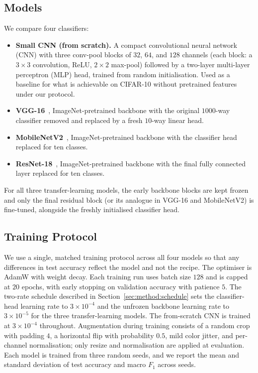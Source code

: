 \documentclass[10pt,twocolumn]{article}
\begin{document}
\subsection{Models}
\label{sec:exp:models}

We compare four classifiers:
\begin{itemize}
  \item \textbf{Small CNN (from scratch).} A compact convolutional neural network (CNN) with three conv-pool blocks of $32$, $64$, and $128$ channels (each block: a $3 \times 3$ convolution, ReLU, $2 \times 2$ max-pool) followed by a two-layer multi-layer perceptron (MLP) head, trained from random initialisation. Used as a baseline for what is achievable on CIFAR-10 without pretrained features under our protocol.
  \item \textbf{VGG-16}~\cite{simonyan2014vgg}, ImageNet-pretrained backbone with the original $1000$-way classifier removed and replaced by a fresh $10$-way linear head.
  \item \textbf{MobileNetV2}~\cite{sandler2018mobilenetv2}, ImageNet-pretrained backbone with the classifier head replaced for ten classes.
  \item \textbf{ResNet-18}~\cite{he2016resnet}, ImageNet-pretrained backbone with the final fully connected layer replaced for ten classes.
\end{itemize}
For all three transfer-learning models, the early backbone blocks are kept frozen and only the final residual block (or its analogue in VGG-16 and MobileNetV2) is fine-tuned, alongside the freshly initialised classifier head.

\subsection{Training Protocol}
\label{sec:exp:protocol}

We use a single, matched training protocol across all four models so that any differences in test accuracy reflect the model and not the recipe. The optimiser is AdamW with weight decay. Each training run uses batch size $128$ and is capped at $20$ epochs, with early stopping on validation accuracy with patience $5$. The two-rate schedule described in Section~\ref{sec:method:schedule} sets the classifier-head learning rate to $3 \times 10^{-4}$ and the unfrozen backbone learning rate to $3 \times 10^{-5}$ for the three transfer-learning models. The from-scratch CNN is trained at $3 \times 10^{-4}$ throughout. Augmentation during training consists of a random crop with padding $4$, a horizontal flip with probability $0.5$, mild color jitter, and per-channel normalisation; only resize and normalisation are applied at evaluation. Each model is trained from three random seeds, and we report the mean and standard deviation of test accuracy and macro $F_1$ across seeds.
\end{document}
